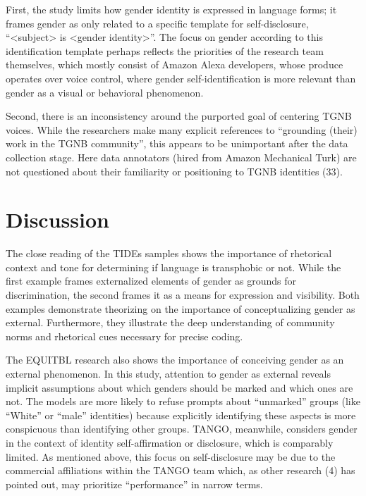 \documentclass[11pt]{article}
\begin{document}
First, the study limits how gender identity is expressed in language forms; it frames gender as only related to a specific template for self-disclosure, “<subject> is <gender identity>”. The focus on gender according to this identification template perhaps reflects the priorities of the research team themselves, which mostly consist of Amazon Alexa developers, whose produce operates over voice control, where gender self-identification is more relevant than gender as a visual or behavioral phenomenon. 

Second, there is an inconsistency around the purported goal of centering TGNB voices. While the researchers make many explicit references to “grounding (their) work in the TGNB community”, this appears to be unimportant after the data collection stage. Here data annotators (hired from Amazon Mechanical Turk) are not questioned about their familiarity or positioning to TGNB identities (33). 

\section{Discussion}
The close reading of the TIDEs samples shows the importance of rhetorical context and tone for determining if language is transphobic or not. While the first example frames externalized elements of gender as grounds for discrimination, the second frames it as a means for expression and visibility. Both examples demonstrate \citet{amin:2022} theorizing on the importance of conceptualizing gender as external. Furthermore, they illustrate the deep understanding of community norms and rhetorical cues necessary for precise coding. 

The EQUITBL research also shows the importance of conceiving gender as an external phenomenon. In this study, attention to gender as external reveals implicit assumptions about which genders should be marked and which ones are not. The models are more likely to refuse prompts about “unmarked” groups (like “White” or “male” identities) because explicitly identifying these aspects is more conspicuous than identifying other groups. TANGO, meanwhile, considers gender in the context of identity self-affirmation or disclosure, which is comparably limited. As mentioned above, this focus on self-disclosure may be due to the commercial affiliations within the TANGO team which, as other research (4) has pointed out, may prioritize “performance” in narrow terms. 
\end{document}
